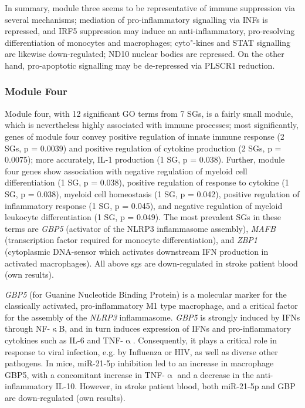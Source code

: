 In summary, module three seems to be representative of immune suppression via several mechanisms; mediation of pro-inflammatory signalling via INFs is repressed, and IRF5 suppression may induce an anti-inflammatory, pro-resolving differentiation of monocytes and macrophages; cyto"-kines and STAT signalling are likewise down-regulated; ND10 nuclear bodies are repressed. On the other hand, pro-apoptotic signalling may be de-repressed via PLSCR1 reduction.

\subsubsection{Module Four}
Module four, with 12 significant GO terms from 7 SGs, is a fairly small module, which is nevertheless highly associated with immune processes; most significantly, genes of module four convey positive regulation of innate immune response (2 SGs, p = 0.0039) and positive regulation of cytokine production (2 SGs, p = 0.0075); more accurately, IL-1 production (1 SG, p = 0.038). Further, module four genes show association with negative regulation of myeloid cell differentiation (1 SG, p = 0.038), positive regulation of response to cytokine (1 SG, p = 0.038), myeloid cell homeostasis (1 SG, p = 0.042), positive regulation of inflammatory response (1 SG, p = 0.045), and negative regulation of myeloid leukocyte differentiation (1 SG, p = 0.049). The most prevalent SGs in these terms are \emph{GBP5} (activator of the NLRP3 inflammasome assembly), \emph{MAFB} (transcription factor required for monocyte differentiation), and \emph{ZBP1} (cytoplasmic DNA-sensor which activates downstream IFN production in activated macrophages). All above \acp{sg} are down-regulated in stroke patient blood (own results).

\emph{GBP5} (for Guanine Nucleotide Binding Protein) is a molecular marker for the classically activated, pro-inflammatory M1 type macrophage,\cite{Fujiwara2016} and a critical factor for the assembly of the \emph{NLRP3} inflammasome.\cite{Shenoy2012} \emph{GBP5} is strongly induced by IFNs through NF-$\upkappa$B, and in turn induces expression of IFNs and pro-inflammatory cytokines such as IL-6 and TNF-$\upalpha$.\cite{Feng2017} Consequently, it plays a critical role in response to viral infection, e.g. by Influenza or HIV, as well as diverse other pathogens.\cite{Feng2017,Krapp2016} In mice, miR-21-5p inhibition led to an increase in macrophage GBP5, with a concomitant increase in TNF-$\upalpha$ and a decrease in the anti-inflammatory IL-10.\cite{Corsetti2018} However, in stroke patient blood, both miR-21-5p and GBP are down-regulated (own results).

